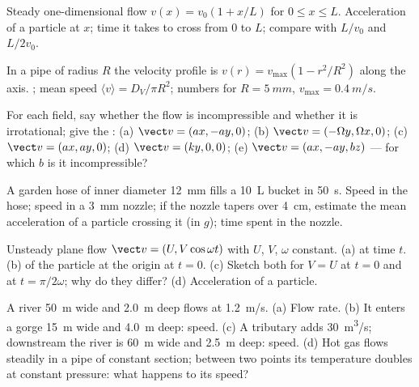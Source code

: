 \begin{exercise}[$\star$]\label{exo:b2:fluid-kinematics:2}
Steady one-dimensional flow $v(x) = v_0(1 + x/L)$ for $0 \le x \le L$.
Acceleration of a particle at $x$; time it takes to cross from $0$ to
$L$; compare with $L/v_0$ and $L/2v_0$.
\end{exercise}

\begin{exercise}[$\star$]\label{exo:b2:fluid-kinematics:3}
In a pipe of radius $R$ the velocity profile is $v(r) = v_{\max}(1 -
r^2/R^2)$ along the axis. ; mean speed $\langle v\rangle
= D_V/\pi R^2$; numbers for $R = \qty{5}{mm}$, $v_{\max} = \qty{0.4}{m/s}$.
\end{exercise}

\begin{exercise}[$\star$]\label{exo:b2:fluid-kinematics:4}
For each field, say whether the flow is incompressible and whether it
is irrotational; give the : (a) $\vect v = (ax, -ay, 0)$; (b)
$\vect v = (-\Omega y, \Omega x, 0)$; (c) $\vect v = (ax, ay, 0)$; (d) $\vect v =
(ky, 0, 0)$; (e) $\vect v = (ax, -ay, bz)$ --- for which $b$ is it
incompressible?
\end{exercise}

\begin{exercise}[$\star\star$]\label{exo:b2:fluid-kinematics:5}
A garden hose of inner diameter \qty{12}{mm} fills a \qty{10}{L} bucket in
\qty{50}{s}. Speed in the hose; speed in a \qty{3}{mm} nozzle; if the
nozzle tapers over \qty{4}{cm}, estimate the mean acceleration of a
particle crossing it (in $g$); time spent in the nozzle.
\end{exercise}

\begin{exercise}[$\star\star$]\label{exo:b2:fluid-kinematics:6}
Unsteady plane flow $\vect v = (U, V\cos\omega t)$ with $U$, $V$, $\omega$
constant. (a)  at time $t$. (b)  of the particle at
the origin at $t = 0$. (c) Sketch both for $V = U$ at $t = 0$ and at
$t = \pi/2\omega$; why do they differ? (d) Acceleration of a particle.
\end{exercise}

\begin{exercise}[$\star\star$]\label{exo:b2:fluid-kinematics:7}
A river \qty{50}{m} wide and \qty{2.0}{m} deep flows at \qty{1.2}{m/s}. (a)
Flow rate. (b) It enters a gorge \qty{15}{m} wide and \qty{4.0}{m} deep:
speed. (c) A tributary adds \qty{30}{m^3/s}; downstream the river is
\qty{60}{m} wide and \qty{2.5}{m} deep: speed. (d) Hot gas flows steadily
in a pipe of constant section; between two points its temperature
doubles at constant pressure: what happens to its speed?
\end{exercise}

